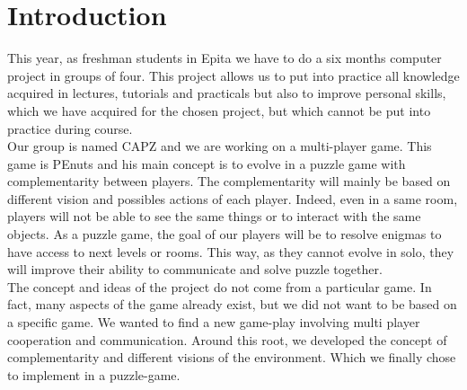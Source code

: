 \documentclass[12pt]{article}
\begin{document}
\begin{titlepage}


\end{titlepage}
\newpage


\tableofcontents
\newpage


\section*{Introduction} 

This year, as freshman students in Epita we have to do a six months computer project in groups of four. This project allows us to put into practice all knowledge acquired in lectures, tutorials and practicals but also to improve personal skills, which we have acquired for the chosen project, but which cannot be put into practice during course.\\

Our group is named CAPZ and we are working on a multi-player game. This game is PEnuts and his main concept is to evolve in a puzzle game with complementarity between players. The complementarity will mainly be based on different vision and possibles actions of each player. Indeed, even in a same room, players will not be able to see the same things or to interact with the same objects. As a puzzle game, the goal of our players will be to resolve enigmas to have access to next levels or rooms. This way, as they cannot evolve in solo, they will improve their ability to communicate and solve puzzle together.\\

The concept and ideas of the project do not come from a particular game. In fact, many aspects of the game already exist, but we did not want to be based on a specific game. We wanted to find a new game-play involving multi player cooperation and communication. Around this root, we developed the concept of complementarity and different visions of the environment. Which we finally chose to implement in a puzzle-game.\\
\end{document}
